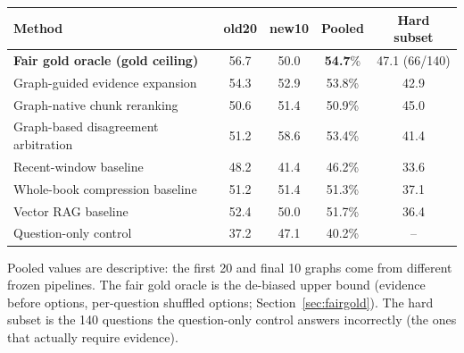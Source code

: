 \begin{tabular}{lcccc}
\toprule
Method & old20 & new10 & Pooled & Hard subset \\
\midrule
\textbf{Fair gold oracle (gold ceiling)} & 56.7 & 50.0 & \textbf{54.7}\% & 47.1 (66/140) \\
\midrule
Graph-guided evidence expansion & 54.3 & 52.9 & 53.8\% & 42.9 \\
Graph-native chunk reranking & 50.6 & 51.4 & 50.9\% & 45.0 \\
Graph-based disagreement arbitration & 51.2 & 58.6 & 53.4\% & 41.4 \\
\midrule
Recent-window baseline & 48.2 & 41.4 & 46.2\% & 33.6 \\
Whole-book compression baseline & 51.2 & 51.4 & 51.3\% & 37.1 \\
Vector RAG baseline & 52.4 & 50.0 & 51.7\% & 36.4 \\
\midrule
Question-only control & 37.2 & 47.1 & 40.2\% & -- \\
\bottomrule
\end{tabular}
\vspace{2pt}\begin{scriptsize}Pooled values are descriptive: the first 20 and final 10 graphs come from different frozen pipelines. The fair gold oracle is the de-biased upper bound (evidence before options, per-question shuffled options; Section~\ref{sec:fairgold}). The hard subset is the 140 questions the question-only control answers incorrectly (the ones that actually require evidence).\end{scriptsize}
